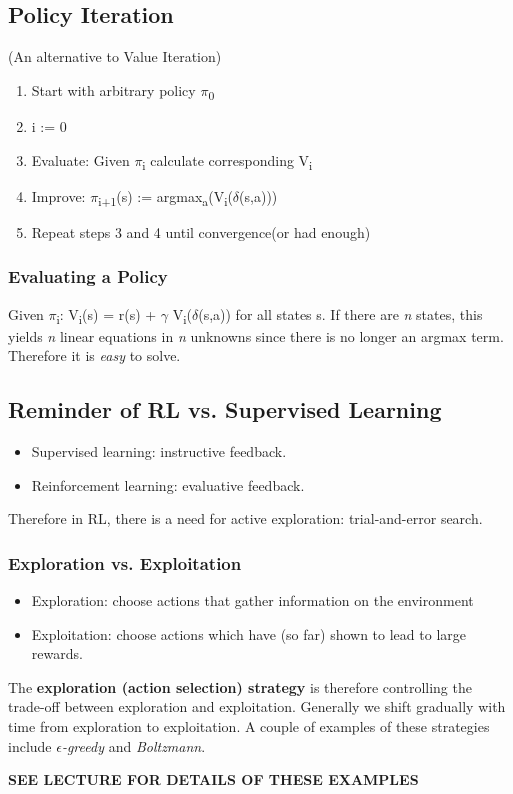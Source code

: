 \documentclass[11pt]{article}
\begin{document}
\subsection{Policy Iteration}
\label{sec:orgced595b}
(An alternative to Value Iteration)
\begin{enumerate}
\item Start with arbitrary policy \(\pi\)\textsubscript{0}
\item i := 0
\item Evaluate: Given \(\pi\)\textsubscript{i} calculate corresponding V\textsubscript{i}
\item Improve: \(\pi\)\textsubscript{i+1}(s) := argmax\textsubscript{a}(V\textsubscript{i}(\(\delta\)(s,a)))
\item Repeat steps 3 and 4 until convergence(or had enough)
\end{enumerate}

\subsubsection{Evaluating a Policy}
\label{sec:org2e4a4f7}
Given \(\pi\)\textsubscript{i}: V\textsubscript{i}(s) = r(s) + \(\gamma\) V\textsubscript{i}(\(\delta\)(s,a)) for all states s.
If there are \emph{n} states, this yields \emph{n} linear equations in \emph{n} unknowns since there is no longer an argmax term.
Therefore it is \emph{easy} to solve.

\subsection{Reminder of RL vs. Supervised Learning}
\label{sec:org8f51136}
\begin{itemize}
\item Supervised learning: instructive feedback.
\item Reinforcement learning: evaluative feedback.
\end{itemize}
Therefore in RL, there is a need for active exploration: trial-and-error search.

\subsubsection{Exploration vs. Exploitation}
\label{sec:orgd7616e6}
\begin{itemize}
\item Exploration: choose actions that gather information on the environment
\item Exploitation: choose actions which have (so far) shown to lead to large rewards.
\end{itemize}
The \textbf{exploration (action selection) strategy} is therefore controlling the trade-off between exploration and exploitation.
Generally we shift gradually with time from exploration to exploitation.
A couple of examples of these strategies include \emph{\(\epsilon\)-greedy} and \emph{Boltzmann}.

\textbf{SEE LECTURE FOR DETAILS OF THESE EXAMPLES}
\end{document}
